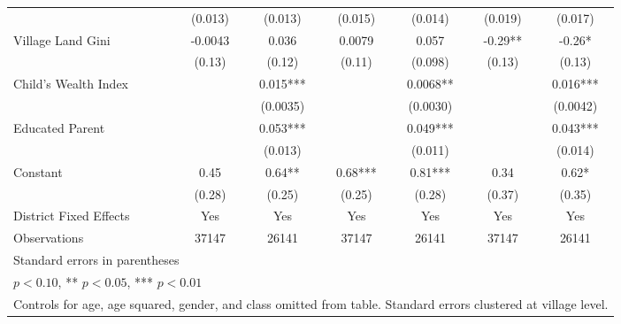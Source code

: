 \begin{sidewaystable}[htbp]
\begin{tabular}{l*{6}{c}}
                &  (0.013)   &  (0.013)   &  (0.015)   &  (0.014)   &  (0.019)   &  (0.017)   \\
Village Land Gini&  -0.0043   &    0.036   &   0.0079   &    0.057   &    -0.29** &    -0.26*  \\
                &   (0.13)   &   (0.12)   &   (0.11)   &  (0.098)   &   (0.13)   &   (0.13)   \\
Child's Wealth Index&            &    0.015***&            &   0.0068** &            &    0.016***\\
                &            & (0.0035)   &            & (0.0030)   &            & (0.0042)   \\
Educated Parent &            &    0.053***&            &    0.049***&            &    0.043***\\
                &            &  (0.013)   &            &  (0.011)   &            &  (0.014)   \\
Constant        &     0.45   &     0.64** &     0.68***&     0.81***&     0.34   &     0.62*  \\
                &   (0.28)   &   (0.25)   &   (0.25)   &   (0.28)   &   (0.37)   &   (0.35)   \\
District Fixed Effects&      Yes   &      Yes   &      Yes   &      Yes   &      Yes   &      Yes   \\
\midrule
Observations    &    37147   &    26141   &    37147   &    26141   &    37147   &    26141   \\
\bottomrule
\multicolumn{7}{l}{\footnotesize Standard errors in parentheses}\\
\multicolumn{7}{l}{\footnotesize * \(p<0.10\), ** \(p<0.05\), *** \(p<0.01\)}\\
\multicolumn{7}{l}{\footnotesize Controls for age, age squared, gender, and class omitted from table. Standard errors clustered at village level.}\\
\end{tabular}
\end{sidewaystable}
